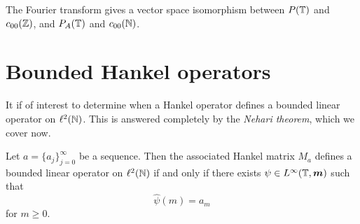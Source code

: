 \documentclass{unswmaths}
\begin{document}
The Fourier transform gives a vector space isomorphism between $P(\mathbb{T})$
and $c_{00}(\mathbb{Z})$, and $P_A(\mathbb{T})$ and $c_{00}(\mathbb{N})$.

\section{Bounded Hankel operators}
It if of interest to determine when a Hankel operator defines
a bounded linear operator on $\ell^2(\mathbb{N})$. This is answered completely by the
\emph{Nehari theorem}, which we cover now.
\begin{theorem}
\label{nehari}
    Let $a = \{a_j\}_{j=0}^\infty$ be a sequence. Then the 
    associated Hankel matrix $M_a$ defines a bounded linear operator on $\ell^2(\mathbb{N})$
    if and only if there exists $\psi \in L^\infty(\mathbb{T},\boldsymbol{m})$ such that
    \begin{equation*}
        \hat{\psi}(m) = a_m
    \end{equation*}
    for $m \geq 0$.
\end{theorem}
\end{document}
